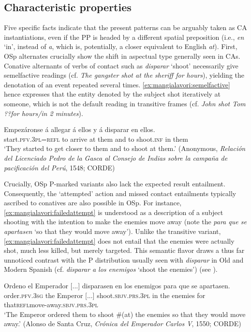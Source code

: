 \documentclass[output=paper,colorlinks,citecolor=brown,
]{langscibook}
\begin{document}
\subsection{Characteristic properties}\label{sec:mangialavori:2-2}

Five specific facts indicate that the present patterns can be arguably taken as CA instantiations, even if the PP is headed by a different spatial preposition (i.e., \textit{en} ‘in’, instead of \textit{a}, which is, potentially, a closer equivalent to English \textit{at}). First, OSp alternates crucially show the shift in aspectual type generally seen in CAs. Conative alternants of verbs of contact such as \textit{disparar} ‘shoot’ necessarily give semelfactive readings (cf. \textit{The gangster shot at the sheriff for hours}), yielding the denotation of an event repeated several times.  \ref{ex:mangialavori:semelfactive} hence expresses that the entity denoted by the subject shot iteratively at someone, which is not the default reading in transitive frames (cf. \textit{John shot Tom ??for hours/in 2 minutes}).

\ea\label{ex:mangialavori:semelfactive}
    \gll Empezáronse á allegar á ellos y á disparar en ellos.\\
 start.\textsc{pfv}.\textsc{3pl}=\textsc{refl} to arrive at them and to shoot.\textsc{inf} in them\\
    \glt ‘They started to get closer to them and to shoot at them.’ (Anonymous, \textit{Relación del Licenciado Pedro de la Gasca al Consejo de Indias sobre la campaña de pacificación del Perú}, 1548; CORDE) 
\z

Crucially, OSp P-marked variants also lack the expected result entailment. Consequently, the ‘attempted’ action and missed contact entailments typically ascribed to conatives are also possible in OSp. For instance,  \ref{ex:mangialavori:failedattempt} is understood as a description of a subject shooting with the intention to make the enemies move away (note the \textit{para que se apartasen} `so that they would move away'). Unlike the transitive variant,  \ref{ex:mangialavori:failedattempt} does not entail that the enemies were actually shot, much less killed, but merely targeted. This semantic flavor draws a thus far unnoticed contrast with the P distribution usually seen with \textit{disparar} in Old and Modern Spanish (cf. \textit{disparar a los enemigos} ‘shoot the enemies’) (see ).

\ea\label{ex:mangialavori:failedattempt}
    \gll Ordeno el Emperador [...] disparasen en los enemigos para que  se apartasen.\\
order.\textsc{pfv}.\textsc{3sg} the Emperor [...] shoot.\textsc{sbjv}.\textsc{prs}.\textsc{3pl} in the enemies for that\textsc{refl}move-away.\textsc{sbjv}.\textsc{prs}.\textsc{3pl}\\
    \glt ‘The Emperor ordered them to shoot \#(at) the enemies so that they would move away.’ (Alonso de Santa Cruz, \textit{Crónica del Emperador Carlos V}, 1550; CORDE)
\z
\end{document}
